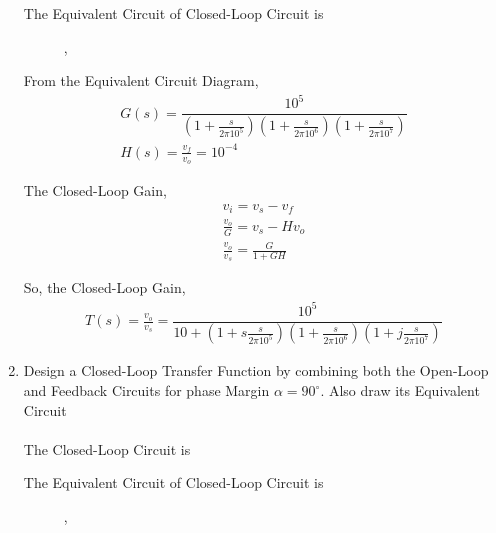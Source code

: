 \begin{enumerate}[label=\thesection.\arabic*.,ref=\thesection.\theenumi]
The Equivalent Circuit of Closed-Loop Circuit is
\begin{figure}[ht!]
	\begin{center}
		\resizebox{\columnwidth}{!}{}
	\end{center},
	\caption{}
	\label{fig:ee18btech11014_Closed-Loop Equivalent Circuit alpha=45}
\end{figure}

From the Equivalent Circuit Diagram,
\begin{align}
G(s) = \dfrac{10^5}{\left(1+\frac{s}{2\pi 10^{5}}\right)\left(1+\frac{s}{2\pi 10^{6}}\right)\left(1+\frac{s}{2\pi 10^{7}}\right)}\\
H(s) = \frac{v_{f}}{v_{o}} = 10^{-4}
\end{align}

The Closed-Loop Gain,
\begin{align}
v_{i} = v_{s} - v_{f}\\
\frac{v_{o}}{G} = v_{s} - Hv_{o}\\
\frac{v_{o}}{v_{s}} = \frac{G}{1+GH}
\end{align}

So, the Closed-Loop Gain,
\begin{align}
T(s) = \frac{v_{o}}{v_{s}} = \dfrac{10^5}{10 + \left(1+s\frac{s}{2\pi 10^{5}}\right)\left(1+\frac{s}{2\pi 10^{6}}\right)\left(1+j\frac{s}{2\pi 10^{7}}\right)}
\end{align}

\item  Design a Closed-Loop Transfer Function by combining both the Open-Loop and Feedback Circuits for phase Margin $\alpha=90^{\circ}$. Also draw its Equivalent Circuit\\
\solution\\
The Closed-Loop Circuit is
\begin{figure}[ht!]
	\begin{center}
		\resizebox{\columnwidth}{!}{}
	\end{center}
	\caption{}
	\label{fig:ee18btech11014_Closed-Loop Circuit alpha=90}
\end{figure}

The Equivalent Circuit of Closed-Loop Circuit is
\begin{figure}[ht!]
	\begin{center}
		\resizebox{\columnwidth}{!}{}
	\end{center},
	\caption{}
	\label{fig:ee18btech11014_Closed-Loop Equivalent Circuit alpha=90}
\end{figure}


\end{enumerate}
